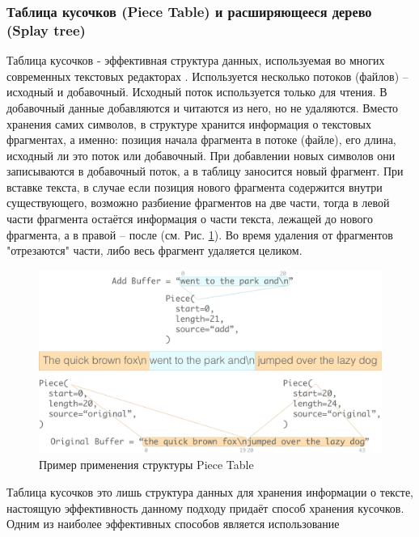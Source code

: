 \documentclass{fefu}
\begin{document}
			\subsubsection{Таблица кусочков (Piece Table) и расширяющееся дерево (Splay tree)}
				\par Таблица кусочков - эффективная структура данных, используемая во многих 
				современных текстовых редакторах \cite{PieceTableArticle}. Используется 
				несколько потоков (файлов) -- исходный и добавочный. Исходный поток 
				используется только для чтения. В добавочный данные добавляются и читаются из 
				него, но не удаляются. Вместо хранения самих символов, в структуре хранится 
				информация о текстовых фрагментах, а именно: позиция начала фрагмента в потоке 
				(файле), его длина, исходный ли это поток или добавочный. При добавлении новых 
				символов они записываются в добавочный поток, а в таблицу заносится новый 
				фрагмент. При вставке текста, в случае если позиция нового фрагмента содержится 
				внутри существующего, возможно разбиение фрагментов на две части, тогда в левой 
				части фрагмента остаётся информация о части текста, лежащей до нового 
				фрагмента, а в правой -- после (см. Рис. \ref{img:PieceTableExample}). Во время 
				удаления от фрагментов "отрезаются" части, либо весь фрагмент удаляется 
				целиком.
				\begin{figure}[h]
					\centering
					\includegraphics[width=1\linewidth]{images/PieceTableExample.png}
					\caption{Пример применения структуры Piece Table}
					\label{img:PieceTableExample}
				\end{figure}
				\par Таблица кусочков это лишь структура данных для хранения информации о
				тексте, настоящую эффективность данному подходу придаёт способ хранения
				кусочков. Одним из наиболее эффективных способов является использование 
\end{document}
